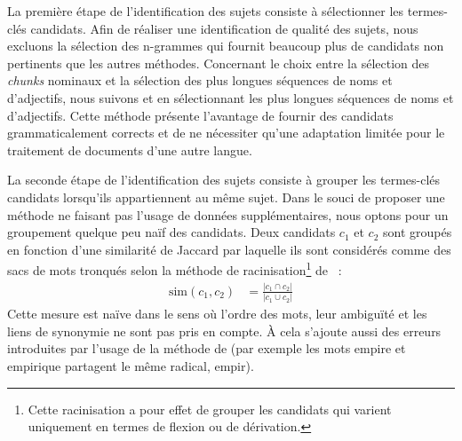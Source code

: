         La première étape de l'identification des sujets consiste à sélectionner
        les termes-clés candidats.
        Afin de réaliser une identification de qualité des sujets, nous excluons
        la sélection des n-grammes qui fournit beaucoup plus de candidats non
        pertinents que les autres méthodes. Concernant le choix entre la
        sélection des \textit{chunks} nominaux et la sélection des plus longues
        séquences de noms et d'adjectifs, nous suivons
         et  en
        sélectionnant les plus longues séquences de noms et d'adjectifs. Cette
        méthode présente l'avantage de fournir des candidats grammaticalement
        corrects et de ne nécessiter qu'une adaptation limitée pour le
        traitement de documents d'une autre langue.

        La seconde étape de l'identification des sujets consiste à grouper les
        termes-clés candidats lorsqu'ils appartiennent au même sujet. Dans le
        souci de proposer une méthode ne faisant pas l'usage de données
        supplémentaires, nous optons pour un groupement quelque peu naïf des
        candidats. Deux candidats $c_1$ et $c_2$ sont groupés en fonction d'une
        similarité de Jaccard par laquelle ils sont considérés comme des sacs de
        mots tronqués selon la méthode de racinisation\footnote{Cette
        racinisation a pour effet de grouper les candidats qui varient
        uniquement en termes de flexion ou de dérivation.} de
        ~:
        \begin{align}
          \text{sim}(c_1, c_2) &= \frac{|c_1 \cap c_2|}{|c_1 \cup c_2|} \label{equa:jaccard}
        \end{align}
        Cette mesure est naïve dans le sens où l'ordre des mots, leur ambiguïté
        et les liens de synonymie ne sont pas pris en compte. À cela s'ajoute
        aussi des erreurs introduites par l'usage de la méthode de
         (par exemple les mots
        \og{}empire\fg{} et \og{}empirique\fg{} partagent le même radical,
        \og{}empir\fg{}).

